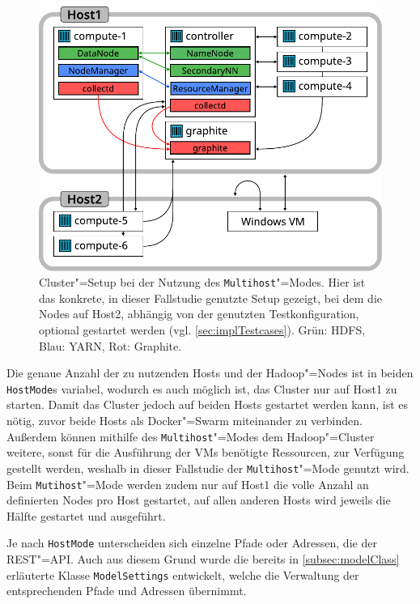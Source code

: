 \begin{figure}[h]
    \includegraphics{./resources/caseStudyHadoopSetup.pdf}
    \caption[Cluster"=Setup bei der Nutzung des Multihost"=Modes]
    {Cluster"=Setup bei der Nutzung des \texttt{Multihost}"=Modes.
    Hier ist das konkrete, in dieser Fallstudie genutzte Setup gezeigt, bei dem die Nodes auf Host2, abhängig von der genutzten Testkonfiguration, optional gestartet werden (vgl. \cref{sec:implTestcases}).
    Grün: HDFS, Blau: YARN, Rot: Graphite.}
    \label{fig:caseStudyHadoopSetup}
\end{figure}

Die genaue Anzahl der zu nutzenden Hosts und der Hadoop"=Nodes ist in beiden \texttt{HostMode}s variabel, wodurch es auch möglich ist, das Cluster nur auf Host1 zu starten.
Damit das Cluster jedoch auf beiden Hosts gestartet werden kann, ist es nötig, zuvor beide Hosts als Docker"=Swarm miteinander zu verbinden.
Außerdem können mithilfe des \texttt{Multihost}"=Modes dem Hadoop"=Cluster weitere, sonst für die Ausführung der VMs benötigte Ressourcen, zur Verfügung gestellt werden, weshalb in dieser Fallstudie der \texttt{Multihost}"=Mode genutzt wird.
Beim \texttt{Mutihost}"=Mode werden zudem nur auf Host1 die volle Anzahl an definierten Nodes pro Host gestartet, auf allen anderen Hosts wird jeweils die Hälfte gestartet und ausgeführt.

Je nach \texttt{HostMode} unterscheiden sich einzelne Pfade oder Adressen, \zB die der REST"=API.
Auch aus diesem Grund wurde die bereits in \cref{subsec:modelClass} erläuterte Klasse \texttt{ModelSettings} entwickelt, welche die Verwaltung der entsprechenden Pfade und Adressen übernimmt.

